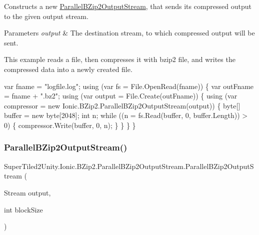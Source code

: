 Constructs a new {\ttfamily \mbox{\hyperlink{class_super_tiled2_unity_1_1_ionic_1_1_b_zip2_1_1_parallel_b_zip2_output_stream}{Parallel\+B\+Zip2\+Output\+Stream}}}, that sends its compressed output to the given output stream. 


\begin{DoxyParams}{Parameters}
{\em output} & The destination stream, to which compressed output will be sent. \\
\hline
\end{DoxyParams}


This example reads a file, then compresses it with bzip2 file, and writes the compressed data into a newly created file.


\begin{DoxyCode}
var fname = \textcolor{stringliteral}{"logfile.log"};
\textcolor{keyword}{using} (var fs = File.OpenRead(fname))
\{
    var outFname = fname + \textcolor{stringliteral}{".bz2"};
    \textcolor{keyword}{using} (var output = File.Create(outFname))
    \{
        \textcolor{keyword}{using} (var compressor = \textcolor{keyword}{new} Ionic.BZip2.ParallelBZip2OutputStream(output))
        \{
            byte[] buffer = \textcolor{keyword}{new} byte[2048];
            \textcolor{keywordtype}{int} n;
            \textcolor{keywordflow}{while} ((n = fs.Read(buffer, 0, buffer.Length)) > 0)
            \{
                compressor.Write(buffer, 0, n);
            \}
        \}
    \}
\}
\end{DoxyCode}
 \mbox{\label{class_super_tiled2_unity_1_1_ionic_1_1_b_zip2_1_1_parallel_b_zip2_output_stream_a412bd13c8f723e74dfcabeecd06ca7fc}} 
\subsubsection{\texorpdfstring{Parallel\+B\+Zip2\+Output\+Stream()}{ParallelBZip2OutputStream()}\hspace{0.1cm}{\footnotesize\ttfamily [2/4]}}
{\footnotesize\ttfamily Super\+Tiled2\+Unity.\+Ionic.\+B\+Zip2.\+Parallel\+B\+Zip2\+Output\+Stream.\+Parallel\+B\+Zip2\+Output\+Stream (\begin{DoxyParamCaption}\item[{Stream}]{output,  }\item[{int}]{block\+Size }\end{DoxyParamCaption})}



